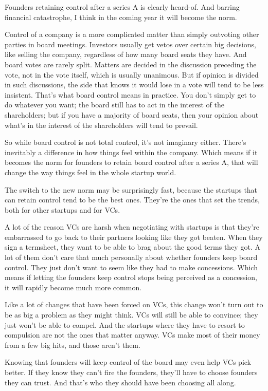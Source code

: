 \documentclass[12pt]{book}
\begin{document}
Founders retaining control after a series A is clearly heard-of. And
barring financial catastrophe, I think in the coming year it will become
the norm.

Control of a company is a more complicated matter than simply outvoting
other parties in board meetings. Investors usually get vetos over
certain big decisions, like selling the company, regardless of how many
board seats they have. And board votes are rarely split. Matters are
decided in the discussion preceding the vote, not in the vote itself,
which is usually unanimous. But if opinion is divided in such
discussions, the side that knows it would lose in a vote will tend to be
less insistent. That's what board control means in practice. You don't
simply get to do whatever you want; the board still has to act in the
interest of the shareholders; but if you have a majority of board seats,
then your opinion about what's in the interest of the shareholders will
tend to prevail.

So while board control is not total control, it's not imaginary either.
There's inevitably a difference in how things feel within the company.
Which means if it becomes the norm for founders to retain board control
after a series A, that will change the way things feel in the whole
startup world.

The switch to the new norm may be surprisingly fast, because the
startups that can retain control tend to be the best ones. They're the
ones that set the trends, both for other startups and for VCs.

A lot of the reason VCs are harsh when negotiating with startups is that
they're embarrassed to go back to their partners looking like they got
beaten. When they sign a termsheet, they want to be able to brag about
the good terms they got. A lot of them don't care that much personally
about whether founders keep board control. They just don't want to seem
like they had to make concessions. Which means if letting the founders
keep control stops being perceived as a concession, it will rapidly
become much more common.

Like a lot of changes that have been forced on VCs, this change won't
turn out to be as big a problem as they might think. VCs will still be
able to convince; they just won't be able to compel. And the startups
where they have to resort to compulsion are not the ones that matter
anyway. VCs make most of their money from a few big hits, and those
aren't them.

Knowing that founders will keep control of the board may even help VCs
pick better. If they know they can't fire the founders, they'll have to
choose founders they can trust. And that's who they should have been
choosing all along.
\end{document}
